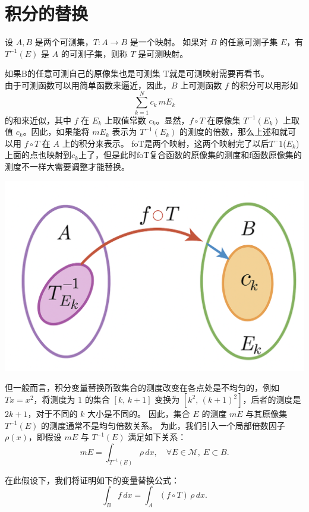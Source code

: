 \documentclass[lang=cn,10pt]{elegantbook}
\begin{document}
\section{积分的替换}
\begin{definition}[可测映射]
设 $A, B$ 是两个可测集，$T: A \to B$ 是一个映射。  
如果对 $B$ 的任意可测子集 $E$，有 $T^{-1}(E)$ 是 $A$ 的可测子集，则称 $T$ 是可测映射。
\end{definition}
如果B的任意可测自己的原像集也是可测集 T就是可测映射需要再看书。\\
由于可测函数可以用简单函数来逼近，因此，$B$ 上可测函数 $f$ 的积分可以用形如
\[
\sum_{k=1}^N c_k\, mE_k
\]
的和来近似，其中 $f$ 在 $E_k$ 上取值常数 $c_k$。显然，$f \circ T$ 在原像集 $T^{-1}(E_k)$ 上取值 $c_k$。因此，如果能将 $mE_k$ 表示为 $T^{-1}(E_k)$ 的测度的倍数，那么上述和就可以用 $f \circ T$ 在 $A$ 上的积分来表示。
foT是两个映射，这两个映射完了以后$T^-1$($E_k$)上面的点也映射到$c_k$上了，但是此时foT复合函数的原像集的测度和f函数原像集的测度不一样大需要调整才能替换。\\
\noindent\begin{minipage}{\linewidth}
  \centering
  \includegraphics[width=0.5\linewidth]{image.png}
  \label{fig:placeholder}
\end{minipage}
但一般而言，积分变量替换所致集合的测度改变在各点处是不均匀的，例如
$T x = x^{2}$，将测度为 $1$ 的集合 $[k,\,k+1]$ 变换为
$[k^{2},\, (k+1)^{2}]$，后者的测度是 $2k+1$，对于不同的 $k$ 大小是不同的。
因此，集合 $E$ 的测度 $mE$ 与其原像集 $T^{-1}(E)$ 的测度通常不是均匀倍数关系。
为此，我们引入一个局部倍数因子 $\rho(x)$，即假设 $mE$ 与 $T^{-1}(E)$ 满足如下关系：
\begin{equation}
mE = \int_{T^{-1}(E)} \rho\,dx, 
\quad \forall E \in \mathcal{M}, \ E \subset B.
\tag{4.5.1}
\end{equation}

在此假设下，我们将证明如下的变量替换公式：
\begin{equation}
\int_{B} f\,dx 
= \int_{A} (f \circ T) \,\rho\,dx.
\tag{4.5.2}
\end{equation}
\end{document}
